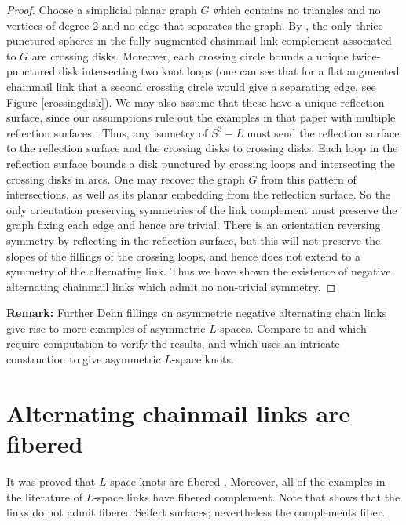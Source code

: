 \documentclass{amsart}
\theoremstyle{definition}
\theoremstyle{remark}
\begin{document}
\begin{proof}
Choose a simplicial planar graph $G$ which contains no triangles and no vertices of degree 2 and no edge that separates the graph.  By \cite[Proposition 2.7]{millichap2023flat}, the only thrice punctured spheres in the  fully augmented chainmail link complement associated to $G$  are crossing disks. Moreover, each crossing circle bounds a unique twice-punctured disk intersecting two knot loops (one can see that for a flat augmented chainmail link that a second crossing circle would give a separating edge, see Figure \ref{crossingdisk}). We may also assume that these have a unique reflection surface, since our assumptions rule out the examples in that paper with multiple reflection surfaces \cite[Theorem 1.2]{millichap2023flat}. Thus, any isometry of $S^3-L$ must send the reflection surface to the reflection surface and the crossing disks to crossing disks. Each loop in the reflection surface bounds a disk punctured by crossing loops and intersecting the crossing disks in arcs. One may recover the graph $G$ from this pattern of intersections, as well as its planar embedding from the reflection surface. So the only orientation preserving symmetries of the link complement must preserve the graph fixing each edge and hence are trivial. There is an orientation reversing symmetry by reflecting in the reflection surface, but this will not preserve the slopes of the fillings of the crossing loops, and hence does not extend to a symmetry of the alternating link. Thus we have shown the existence of negative alternating chainmail links which admit no non-trivial symmetry. 
\end{proof} 

{\bf Remark:} Further Dehn fillings on asymmetric negative alternating chain links give rise to more examples of asymmetric $L$-spaces. Compare to \cite[Theorem 1.2]{MR3507256} and \cite{anderson2021lspace} which require computation to verify the results, and  \cite{MR4194294} which uses an intricate construction to give asymmetric $L$-space knots. 

\section{Alternating chainmail links are fibered}
It was proved that $L$-space knots are  fibered \cite{MR2357503}. Moreover, all of the examples in the literature of $L$-space links have fibered complement. Note that \cite[Example 3.9]{MR3692910} shows that the links do not admit fibered Seifert surfaces; nevertheless the complements fiber. 
\end{document}
